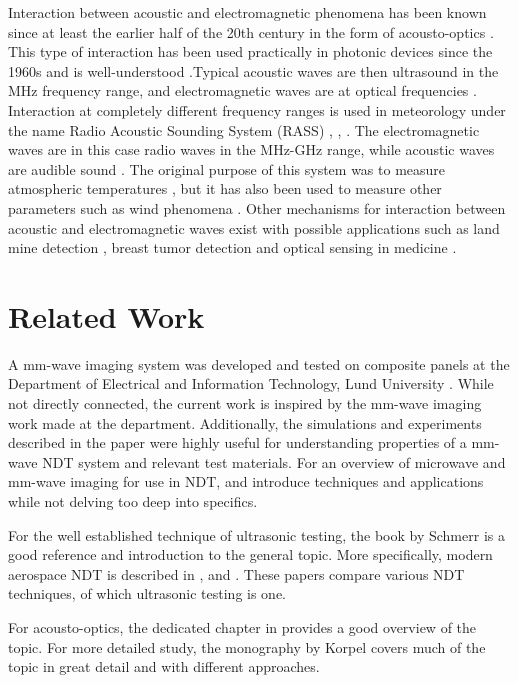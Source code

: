 \documentclass[11pt,twoside]{eitExjobb}
\begin{document}
	Interaction between acoustic and electromagnetic phenomena has been known since at least the earlier half of the 20th century in the form of acousto-optics \cite{Korpel1981}. This type of interaction has been used practically in photonic devices since the 1960s and is well-understood \cite{Korpel1981}.Typical acoustic waves are then ultrasound in the MHz frequency range, and electromagnetic waves are at optical frequencies \cite{Korpel1981}. Interaction at completely different frequency ranges is used in meteorology under the name Radio Acoustic Sounding System (RASS) \cite{Marshall1972}, \cite{May1990}, \cite{Gjessing2001}. The electromagnetic waves are in this case radio waves in the MHz-GHz range, while acoustic waves are audible sound \cite{May1990}. The original purpose of this system was to measure atmospheric temperatures \cite{Marshall1972}, but it has also been used to measure other parameters such as wind phenomena \cite{Gjessing2001}. Other mechanisms for interaction between acoustic and electromagnetic waves exist with possible applications such as land mine detection \cite{Scott1999}, breast tumor detection \cite{Top2016} and optical sensing in medicine \cite{Elson2011}.
	
	\section{Related Work}	
	A mm-wave imaging system was developed and tested on composite panels at the Department of Electrical and Information Technology, Lund University \cite{Helander2017}. While not directly connected, the current work is inspired by the mm-wave imaging work made at the department. Additionally, the simulations and experiments described in the paper were highly useful for understanding properties of a mm-wave NDT system and relevant test materials. For an overview of microwave and mm-wave imaging for use in NDT, \cite{Kharkovsky2007} and \cite{Dobmann2012} introduce techniques and applications while not delving too deep into specifics.
	
	For the well established technique of ultrasonic testing, the book by Schmerr \cite{Schmerr2016} is a good reference and introduction to the general topic. More specifically, modern aerospace NDT is described in \cite{Garnier2011}, \cite{Katunin2015} and \cite{Riegert2006}. These papers compare various NDT techniques, of which ultrasonic testing is one.
	
	For acousto-optics, the dedicated chapter in \cite{Saleh2007} provides a good overview of the topic. For more detailed study, the monography by Korpel \cite{Korpel1988} covers much of the topic in great detail and with different approaches.
	
\end{document}
